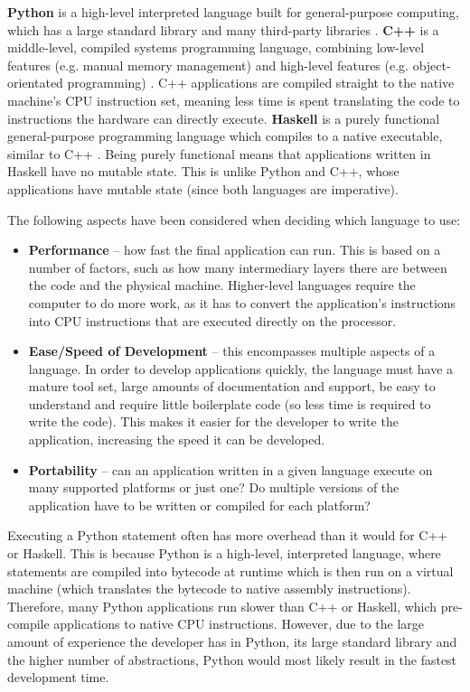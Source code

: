 \textbf{Python} is a high-level interpreted language built for general-purpose computing, which has a large standard library and many third-party libraries \cite{python}. \textbf{C++} is a middle-level, compiled systems programming language, combining low-level features (e.g. manual memory management) and high-level features (e.g. object-orientated programming) \cite{cpp}. C++ applications are compiled straight to the native machine's CPU instruction set, meaning less time is spent translating the code to instructions the hardware can directly execute. \textbf{Haskell} is a purely functional general-purpose programming language which compiles to a native executable, similar to C++ \cite{haskell}. Being purely functional means that applications written in Haskell have no mutable state. This is unlike Python and C++, whose applications have mutable state (since both languages are imperative).

The following aspects have been considered when deciding which language to use:
\begin{itemize}
	\item \textbf{Performance} -- how fast the final application can run. This is based on a number of factors, such as how many intermediary layers there are between the code and the physical machine. Higher-level languages require the computer to do more work, as it has to convert the application's instructions into CPU instructions that are executed directly on the processor.
	\item \textbf{Ease/Speed of Development} -- this encompasses multiple aspects of a language. In order to develop applications quickly, the language must have a mature tool set, large amounts of documentation and support, be easy to understand and require little boilerplate code (so less time is required to write the code). This makes it easier for the developer to write the application, increasing the speed it can be developed.
	\item \textbf{Portability} -- can an application written in a given language execute on many supported platforms or just one? Do multiple versions of the application have to be written or compiled for each platform?
\end{itemize}
 
Executing a Python statement often has more overhead than it would for C++ or Haskell. This is because Python is a high-level, interpreted language, where statements are compiled into bytecode at runtime which is then run on a virtual machine (which translates the bytecode to native assembly instructions). Therefore, many Python applications run slower than C++ or Haskell, which pre-compile applications to native CPU instructions. However, due to the large amount of experience the developer has in Python, its large standard library and the higher number of abstractions, Python would most likely result in the fastest development time. 

